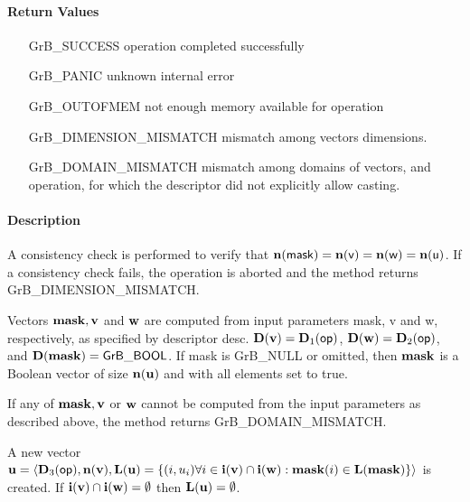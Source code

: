 \paragraph{Return Values}

\begin{itemize}[leftmargin=2.1in]
\item[{\sf GrB\_SUCCESS}]             operation completed successfully
\item[{\sf GrB\_PANIC}]               unknown internal error
\item[{\sf GrB\_OUTOFMEM}]            not enough memory available for operation
\item[{\sf GrB\_DIMENSION\_MISMATCH}] mismatch among vectors dimensions.
\item[{\sf GrB\_DOMAIN\_MISMATCH}]    mismatch among domains of vectors, and operation, for which the descriptor did not explicitly allow casting.
\end{itemize}

\paragraph{Description}

A consistency check is performed to verify that $\bold{n}({\sf mask})
= \bold{n}({\sf v}) = \bold{n}({\sf w}) = \bold{n}({\sf u})$. If a consistency
check fails, the operation is aborted and the method returns {\sf
GrB\_DIMENSION\_MISMATCH}.


Vectors ${\bf mask}, {\bf v}$ and ${\bf w}$ are computed from
input parameters {\sf mask}, {\sf v} and {\sf w}, respectively, as specified
by descriptor {\sf desc}. $\bold{D}({\bf v}) = \bold{D}_1({\sf op})$, 
$\bold{D}({\bf w}) = \bold{D}_2({\sf op})$, and
$\bold{D}({\bf mask}) = {\sf GrB\_BOOL}$.  If {\sf mask} is {\sf GrB\_NULL} or
omitted, then ${\bf mask}$ is a Boolean vector of size $\bold{n}({\bf u})$
and with all elements set to {\sf true}.

If any of ${\bf mask}, {\bf v}$ or ${\bf w}$ cannot be computed
from the input parameters as described above, the method returns {\sf
GrB\_DOMAIN\_MISMATCH}.  

A new vector ${\bf u} = \langle \bold{D}_3({\sf op}),
\bold{n}({\bf v}), \bold{L}({\bf u}) = \{(i,u_i)  \forall i \in
{\bf i}({\bf v}) \cap {\bf i}({\bf w}) : {\bf mask}(i)
\in \bold{L}({\bf mask}) \} \rangle$ is created.  If 
${\bf i}({\bf v}) \cap {\bf i}({\bf w}) = \emptyset$
then $\bold{L}({\bf u}) = \emptyset$.

